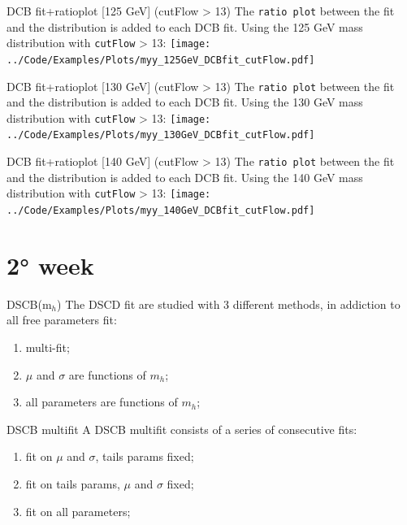 \documentclass[10pt,UKenglish, leqno, xcolor = dvipsnames]{beamer}
\begin{document}
		\begin{frame}{DCB fit+ratioplot [125 GeV] (cutFlow > 13)}
			\vfill
			The \texttt{ratio plot} between the fit and the distribution is added to each DCB fit. Using the 125 GeV mass distribution with \texttt{cutFlow} > 13:
			\texttt{[image: ../Code/Examples/Plots/myy\_125GeV\_DCBfit\_cutFlow.pdf]}
			\vfill
		\end{frame}
		
		\begin{frame}{DCB fit+ratioplot [130 GeV] (cutFlow > 13)}
			\vfill
			The \texttt{ratio plot} between the fit and the distribution is added to each DCB fit. Using the 130 GeV mass distribution with \texttt{cutFlow} > 13:
			\texttt{[image: ../Code/Examples/Plots/myy\_130GeV\_DCBfit\_cutFlow.pdf]}
			\vfill
		\end{frame}
		
		\begin{frame}{DCB fit+ratioplot [140 GeV] (cutFlow > 13)}
			\vfill
			The \texttt{ratio plot} between the fit and the distribution is added to each DCB fit. Using the 140 GeV mass distribution with \texttt{cutFlow} > 13:
			\texttt{[image: ../Code/Examples/Plots/myy\_140GeV\_DCBfit\_cutFlow.pdf]}
			\vfill
		\end{frame}
	
	\section{2° week}
	\SectionPage
	
		\begin{frame}{DSCB(m$_{h}$)}
			\vfill
			The DSCD fit are studied with 3 different methods, in addiction to all free parameters fit:
			\begin{enumerate}
				\item multi-fit;
				\item $\mu$ and $\sigma$ are functions of $m_h$;
				\item all parameters are functions of $m_h$;
			\end{enumerate}
			\vfill
		\end{frame}

		\begin{frame}{DSCB multifit}
			\vfill
			A DSCB multifit consists of a series of consecutive fits:
			\begin{enumerate}
				\item fit on $\mu$ and $\sigma$, tails params fixed;
				\item fit on tails params, $\mu$ and $\sigma$ fixed;
				\item fit on all parameters;
			\end{enumerate}
			\vfill
		\end{frame}
	
\end{document}
